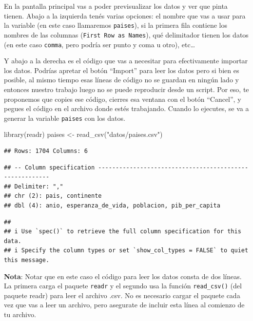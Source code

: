 \documentclass[
  openany]{book}
\newenvironment{Shaded}{\begin{snugshade}}{\end{snugshade}}
\newcommand{\FunctionTok}[1]{\textcolor[rgb]{0.00,0.00,0.00}{#1}}
\newcommand{\NormalTok}[1]{#1}
\newcommand{\OtherTok}[1]{\textcolor[rgb]{0.56,0.35,0.01}{#1}}
\newcommand{\StringTok}[1]{\textcolor[rgb]{0.31,0.60,0.02}{#1}}
\begin{document}
En la pantalla principal vas a poder previsualizar los datos y ver que pinta tienen.
Abajo a la izquierda tenés varias opciones: el nombre que vas a usar para la variable (en este caso llamaremos \texttt{paises}), si la primera fila contiene los nombres de las columnas (\texttt{First\ Row\ as\ Names}), qué delimitador tienen los datos (en este caso \texttt{comma}, pero podría ser punto y coma u otro), etc\ldots{}

Y abajo a la derecha es el código que vas a necesitar para efectivamente importar los datos.
Podrías apretar el botón ``Import'' para leer los datos pero si bien es posible, al mismo tiempo esas líneas de código no se guardan en ningún lado y entonces nuestro trabajo luego no se puede reproducir desde un script.
Por eso, te proponemos que copies ese código, cierres esa ventana con el botón ``Cancel'', y pegues el código en el archivo donde estés trabajando.
Cuando lo ejecutes, se va a generar la variable \texttt{paises} con los datos.

\begin{Shaded}
\begin{Highlighting}[]
\FunctionTok{library}\NormalTok{(readr)}
\NormalTok{paises }\OtherTok{\textless{}{-}} \FunctionTok{read\_csv}\NormalTok{(}\StringTok{"datos/paises.csv"}\NormalTok{)}
\end{Highlighting}
\end{Shaded}

\begin{verbatim}
## Rows: 1704 Columns: 6
\end{verbatim}

\begin{verbatim}
## -- Column specification --------------------------------------------------------
## Delimiter: ","
## chr (2): pais, continente
## dbl (4): anio, esperanza_de_vida, poblacion, pib_per_capita
\end{verbatim}

\begin{verbatim}
## 
## i Use `spec()` to retrieve the full column specification for this data.
## i Specify the column types or set `show_col_types = FALSE` to quiet this message.
\end{verbatim}

\textbf{Nota}: Notar que en este caso el código para leer los datos consta de dos líneas.
La primera carga el paquete \texttt{readr} y el segundo usa la función \texttt{read\_csv()} (del paquete readr) para leer el archivo .csv.
No es necesario cargar el paquete cada vez que vas a leer un archivo, pero asegurate de incluir esta línea al comienzo de tu archivo.
\end{document}
